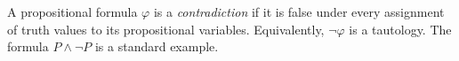 
A propositional formula $\varphi$ is a \emph{contradiction} if it is false under every assignment of truth values to its propositional variables. Equivalently, $\neg\varphi$ is a tautology. The formula $P\land\neg P$ is a standard example.
